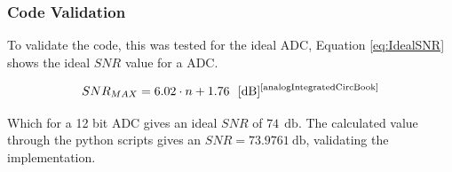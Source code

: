 \subsubsection{Code Validation}

To validate the code, this was tested for the ideal ADC, Equation \ref{eq:IdealSNR} shows the ideal $SNR$ value for a ADC. 

\begin{equation}
    SNR_{MAX} = 6.02\cdot n+1.76~~[\si{\decibel}] \textsuperscript{\cite{analogIntegratedCircBook}}
    \label{eq:IdealSNR}
\end{equation}

Which for a 12 bit ADC gives an ideal $SNR$ of $74~~\si{\decibel}$. The calculated value through the python scripts gives an $SNR = 73.9761~\si{\decibel}$, validating the implementation.





